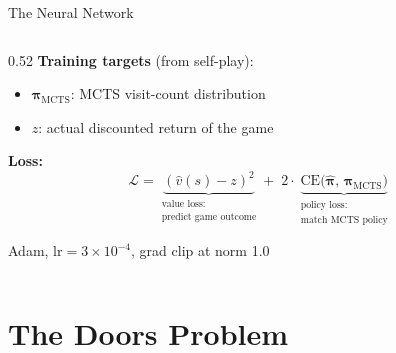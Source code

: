 \documentclass[aspectratio=169, 10pt]{beamer}
\begin{document}
\begin{frame}{The Neural Network}
\begin{columns}[T]
\begin{column}{0.52\textwidth}
\vspace{0.3cm}
\textbf{Training targets} (from self-play):
\begin{itemize}
  \item $\boldsymbol{\pi}_\text{MCTS}$: MCTS visit-count distribution
  \item $z$: actual discounted return of the game
\end{itemize}

\vspace{0.3cm}
\textbf{Loss:}
\[
  \mathcal{L} = \underbrace{(\hat{v}(s) - z)^2}_{\substack{\text{value loss:}\\\text{predict game outcome}}}
              + \; 2 \cdot \underbrace{\text{CE}\bigl(\hat{\boldsymbol{\pi}},\, \boldsymbol{\pi}_\text{MCTS}\bigr)}_{\substack{\text{policy loss:}\\\text{match MCTS policy}}}
\]

\vspace{0.1cm}
{\small Adam, $\text{lr} = 3 \times 10^{-4}$, grad clip at norm 1.0}
\end{column}
\end{columns}
\end{frame}

\section{The Doors Problem}
\end{document}
